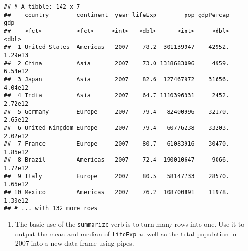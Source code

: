 \documentclass[]{article}
\newenvironment{Shaded}{\begin{snugshade}}{\end{snugshade}}
\newcommand{\KeywordTok}[1]{\textcolor[rgb]{0.13,0.29,0.53}{\textbf{#1}}}
\newcommand{\DataTypeTok}[1]{\textcolor[rgb]{0.13,0.29,0.53}{#1}}
\newcommand{\DecValTok}[1]{\textcolor[rgb]{0.00,0.00,0.81}{#1}}
\newcommand{\StringTok}[1]{\textcolor[rgb]{0.31,0.60,0.02}{#1}}
\newcommand{\OperatorTok}[1]{\textcolor[rgb]{0.81,0.36,0.00}{\textbf{#1}}}
\newcommand{\NormalTok}[1]{#1}
\providecommand{\tightlist}{%
  \setlength{\itemsep}{0pt}\setlength{\parskip}{0pt}}
\begin{document}
\begin{Shaded}
\end{Shaded}

\begin{verbatim}
## # A tibble: 142 x 7
##    country        continent  year lifeExp        pop gdpPercap     gdp
##    <fct>          <fct>     <int>   <dbl>      <int>     <dbl>   <dbl>
##  1 United States  Americas   2007    78.2  301139947    42952. 1.29e13
##  2 China          Asia       2007    73.0 1318683096     4959. 6.54e12
##  3 Japan          Asia       2007    82.6  127467972    31656. 4.04e12
##  4 India          Asia       2007    64.7 1110396331     2452. 2.72e12
##  5 Germany        Europe     2007    79.4   82400996    32170. 2.65e12
##  6 United Kingdom Europe     2007    79.4   60776238    33203. 2.02e12
##  7 France         Europe     2007    80.7   61083916    30470. 1.86e12
##  8 Brazil         Americas   2007    72.4  190010647     9066. 1.72e12
##  9 Italy          Europe     2007    80.5   58147733    28570. 1.66e12
## 10 Mexico         Americas   2007    76.2  108700891    11978. 1.30e12
## # ... with 132 more rows
\end{verbatim}

\begin{enumerate}
\def\labelenumi{\arabic{enumi}.}
\setcounter{enumi}{6}
\tightlist
\item
  The basic use of the \texttt{summarize} verb is to turn many rows into
  one. Use it to output the mean and median of \texttt{lifeExp} as well
  as the total population in 2007 into a new data frame using pipes.
\end{enumerate}

\begin{Shaded}
\end{Shaded}
\end{document}
